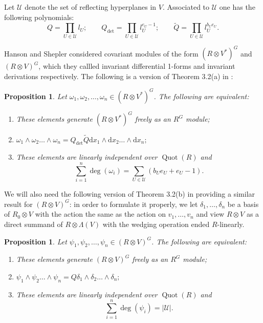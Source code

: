 \documentclass[a4paper]{amsart}
\newcommand{\dd}{\mathrm{d}}
\def\Quot{\operatorname{Quot}}
\newtheorem{prop}[Lemma]{Proposition}
\newtheorem*{Corollary of Conjecture}{Corollary of Conjecture}
\theoremstyle{definition}
\theoremstyle{remark}
\theoremstyle{Acknowledgments}
\begin{document}
Let $\mathcal{U}$ denote the set of reflecting hyperplanes in $V$. Associated to $\mathcal{U}$ one has the following polynomials:
\[Q = \prod_{U \in \mathcal{U}} l_U; \qquad Q_{\det}= \prod_{U \in \mathcal{U}} l_U^{e_U-1}; \qquad \tilde{Q} =\prod_{U \in \mathcal{U}} l_U^{b_Ue_U}.\]

Hanson and Shepler considered covariant modules of the form $(R \otimes V^*)^G$ and $(R \otimes V)^G$, which they callled invariant differential 1-forms and invariant derivations respectively. The following is a version of Theorem 3.2(a) in \cite{HansonShepler}:

\begin{prop}\label{1formcriterion}
Let $\omega_1, \omega_2, \ldots, \omega_n \in (R \otimes V^*)^G$. The following are equivalent:
\begin{enumerate}
\item These elements generate $(R \otimes V^*)^G$ freely as an $R^G$ module;
\item $\omega_1 \wedge \omega_2 \ldots \wedge \omega_n = Q_{\det} \tilde{Q} \dd x_1 \wedge \dd x_2 \ldots \wedge \dd x_n;$
\item These elements are linearly independent over $\Quot(R)$ and $$\sum_{i=1}^n \deg(\omega_i) = \sum_{U \in \mathcal{U}}(b_Ue_U+e_U-1).$$
\end{enumerate}
\end{prop}

We will also need the following version of Theorem 3.2(b) in \cite{HansonShepler} providing a  similar result for $(R \otimes V)^G$: in order to formulate it properly, we let $\delta_1, \ldots, \delta_n$ be a basis of $R_0 \otimes V$ with the action the same as the action on $v_1, \ldots, v_n$ and view $R \otimes V$ as a direct summand of $R \otimes \Lambda(V)$ with the wedging operation ended $R$-linearly. 



\begin{prop}\label{derivcriterion}
Let $\psi_1, \psi_2, \ldots, \psi_n \in (R \otimes V)^G$. The following are equivalent:
\begin{enumerate}
\item These elements generate $(R \otimes V)^G$ freely as an $R^G$ module;
\item $\psi_1 \wedge \psi_2 \ldots \wedge \psi_n = Q \delta_1 \wedge \delta_2 \ldots \wedge \delta_n;$
\item These elements are linearly independent over $\Quot(R)$ and $$\sum_{i=1}^n \deg(\psi_i) = |\mathcal{U}|.$$
\end{enumerate}
\end{prop}
\end{document}
